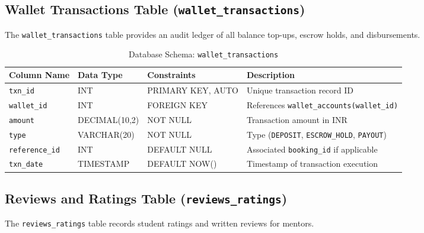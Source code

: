 \documentclass[12pt,a4paper]{report}
\begin{document}
\subsection{Wallet Transactions Table (\texttt{wallet\_transactions})}
The \texttt{wallet\_transactions} table provides an audit ledger of all balance top-ups, escrow holds, and disbursements.

\begin{table}[H]
\centering
\small
\caption{Database Schema: \texttt{wallet\_transactions}}
\label{tab:schema_wallet_transactions}
\begin{tabularx}{\textwidth}{|L{3.0cm}|L{2.8cm}|L{2.5cm}|J|}
\hline
\textbf{Column Name} & \textbf{Data Type} & \textbf{Constraints} & \textbf{Description} \\ \hline
\texttt{txn\_id} & INT & PRIMARY KEY, AUTO & Unique transaction record ID \\ \hline
\texttt{wallet\_id} & INT & FOREIGN KEY & References \texttt{wallet\_accounts(wallet\_id)} \\ \hline
\texttt{amount} & DECIMAL(10,2) & NOT NULL & Transaction amount in INR \\ \hline
\texttt{type} & VARCHAR(20) & NOT NULL & Type (\texttt{DEPOSIT}, \texttt{ESCROW\_HOLD}, \texttt{PAYOUT}) \\ \hline
\texttt{reference\_id} & INT & DEFAULT NULL & Associated \texttt{booking\_id} if applicable \\ \hline
\texttt{txn\_date} & TIMESTAMP & DEFAULT NOW() & Timestamp of transaction execution \\ \hline
\end{tabularx}
\end{table}

\subsection{Reviews and Ratings Table (\texttt{reviews\_ratings})}
The \texttt{reviews\_ratings} table records student ratings and written reviews for mentors.
\end{document}
